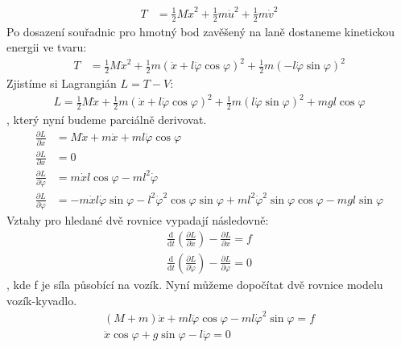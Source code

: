 \documentclass[a4paper, 12pt]{article}
\begin{document}
			\begin{align*}
				T &= \frac{1}{2}M\dot{x}^2+\frac{1}{2}m\dot{u}^2+\frac{1}{2}m\dot{v}^2
			\end{align*}
			Po dosazení souřadnic pro hmotný bod zavěšený na laně dostaneme kinetickou energii ve tvaru:
			\begin{align*}
				T &= \frac{1}{2}M\dot{x}^2+\frac{1}{2}m\left(\dot{x}+l\dot{\varphi}\cos\varphi\right)^2+\frac{1}{2}m\left(-l\dot{\varphi}\sin\varphi\right)^2
			\end{align*}
			Zjistíme si Lagrangián $L = T - V$:
			\begin{align*}
				L = \frac{1}{2}M\dot{x}+\frac{1}{2}m\left(\dot{x}+l\dot{\varphi}\cos\varphi\right)^2+\frac{1}{2}m\left(l\dot{\varphi}\sin\varphi\right)^2+mgl\cos\varphi
			\end{align*}
			, který nyní budeme parciálně derivovat.
			\begin{align*}
				\frac{\partial L}{\partial\dot{x}} &= M\dot{x}+m\dot{x}+ml\dot{\varphi}\cos\varphi\\
				\frac{\partial L}{\partial x} &= 0\\
				\frac{\partial L}{\partial \dot{\varphi}} &= m\dot{x}l\cos\varphi - ml^2\dot{\varphi}\\
				\frac{\partial L}{\partial \varphi} &= -m\dot{x}l\dot{\varphi}\sin\varphi-l^2\dot{\varphi}^2\cos\varphi\sin\varphi+ml^2\dot{\varphi}^2\sin\varphi\cos\varphi-mgl\sin\varphi
			\end{align*}
			Vztahy pro hledané dvě rovnice vypadají následovně:
			\begin{align*}
				\frac{\mathrm{d}}{\mathrm{d}t}\left(\frac{\partial L}{\partial \dot{x}}\right)-\frac{\partial L}{\partial x} = f\\
				\frac{\mathrm{d}}{\mathrm{d}t}\left(\frac{\partial L}{\partial \dot{\varphi}}\right)-\frac{\partial L}{\partial \varphi} = 0
			\end{align*}
			, kde f je síla působící na vozík. Nyní můžeme dopočítat dvě rovnice modelu vozík-kyvadlo.
			\begin{align}
				\left(M+m\right)\ddot{x}+ml\ddot{\varphi}\cos\varphi-ml\dot{\varphi}^2\sin\varphi = f
				\label{rovnice_model_1}\\
				\ddot{x}\cos\varphi+g\sin\varphi-l\ddot{\varphi} = 0
			    \label{rovnice_model_2}
			\end{align}
\end{document}
